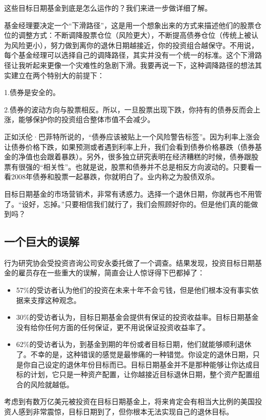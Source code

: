 这些目标日期基金到底是怎么运作的？我们来进一步做详细了解。

基金经理要决定一个“下滑路径”，这是用一个想象出来的方式来描述他们的股票仓位的调整方式：不断调降股票仓位（风险更大），不断提高债券仓位（传统上被认为风险更小），努力做到离你的退休日期越接近，你的投资组合越保守。不用说，每个基金经理可以选择自己的调降路径，其实并没有一个统一的标准。这个下滑路径让我听起来更像一个灾难性的急剧下滑。我要再说一下，这种调降路径的想法其实建立在两个特别大的前提下：

1.债券是安全的。

2.债券的波动方向与股票相反。所以，一旦股票出现下跌，你持有的债券反而会上涨，能够保护你的投资组合整体市值不会减少。

正如沃伦·巴菲特所说的，“债券应该被贴上一个风险警告标签”。因为利率上涨会让债券价格下跌，如果预测或者遇到利率上升，我们会看到债券价格暴跌（债券基金的净值也会跟着暴跌）。另外，很多独立研究表明在经济糟糕的时候，债券跟股票有很强的“相关性”。也就是说，股票和债券并不总是相反方向波动的。只要看一看2008年债券和股票一起暴跌，你就明白了。业内称之为股债双杀。

目标日期基金的市场营销术，非常有诱惑力。选择一个退休日期，你就再也不用管了。“设好，忘掉。”只要相信我们就行了，我们会照顾好你的。但是他们真的能做到吗？

\subsection{一个巨大的误解}

行为研究协会受投资咨询公司安永委托做了一个调查。结果发现，投资目标日期基金的雇员存在一些重大的误解，简直会让人惊讶得下巴都掉了：

\begin{itemize}
\item 57\%的受访者认为他们的投资在未来十年不会亏钱，但是他们根本没有事实依据来支撑这种观念。
\item 30\%的受访者认为，目标日期基金会提供有保证的投资收益率。目标日期基金没有给你任何方面的任何保证，更不用说保证投资收益率了。
\item 62\%的受访者认为，到基金到期的年份或者目标日期，他们就能够顺利退休了。不幸的是，这种错误的感觉是最惨痛的一种错觉。你设定的退休日期，只是你自己设定的退休年份目标而已。目标日期基金并不是那种能够让你达成目标的计划，它只是一种资产配置，让你越接近目标退休日期，整个资产配置组合的风险就越低。
\end{itemize}

考虑到有数万亿美元被投资在目标日期基金上，将来肯定会有相当大比例的美国投资人感到非常震惊，目标日期到了，但你根本无法实现自己的退休目标。

